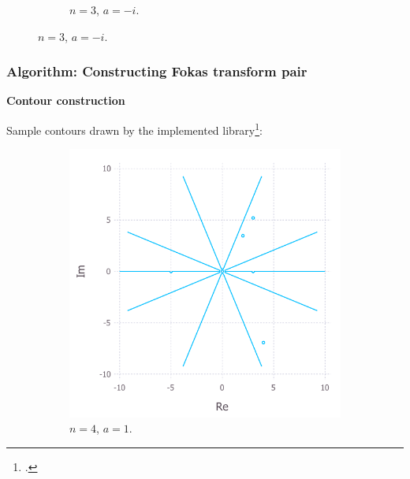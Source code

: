 \documentclass{beamer}
\begin{document}
\begin{frame}[t]
\begin{figure}
\begin{subfigure}{.45\textwidth}
            \caption{$n=3$, $a=-i$.}
        \end{subfigure}
    \end{figure}
\end{frame}

\begin{frame}[t]
    \frametitle{Algorithm: Constructing Fokas transform pair}
    \textbf{Contour construction}

    Sample contours drawn by the implemented library\footcite{Xiao}:
    \begin{figure}
        \begin{subfigure}{.45\textwidth}
            \centering
            \includegraphics[width=1\linewidth]{contourPlot_n=4_a=1_cropped.pdf}
            \caption{$n=4$, $a=1$.}
        \end{subfigure}
        \begin{subfigure}{.45\textwidth}
            \centering

\end{subfigure}
\end{figure}
\end{frame}
\end{document}
